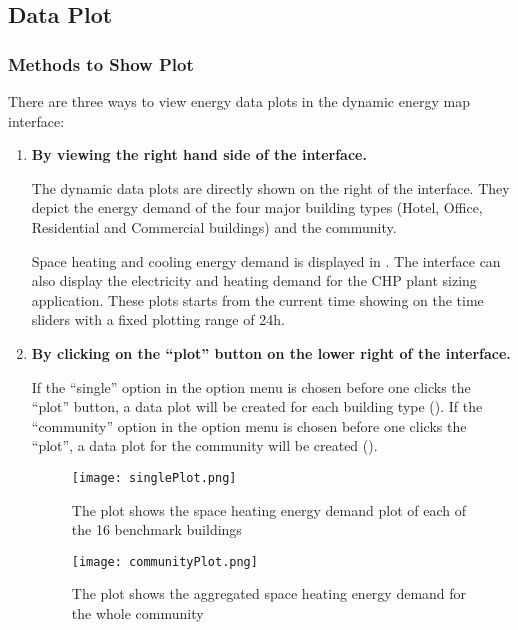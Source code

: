 \subsection{Data Plot}
\subsubsection{Methods to Show Plot}
There are three ways to view energy data plots in the dynamic energy
map interface:
\begin{enumerate}[1)]
\item \textbf{By viewing the right hand side of the interface.}

  The dynamic data plots are directly shown on the right of the
  interface. They depict the energy demand of the four major building
  types (Hotel, Office, Residential and Commercial buildings) and the
  community.

  Space heating and cooling energy demand is displayed in
  . The interface can also display the
  electricity and heating demand for the CHP plant sizing
  application. These plots starts from the current time showing on the
  time sliders with a fixed plotting range of 24h.

\item \textbf{By clicking on the ``plot'' button on the lower right of
    the interface.}

  If the ``single'' option in the option menu is chosen before one
  clicks the ``plot'' button, a data plot will be created for each
  building type (). If the ``community'' option
  in the option menu is chosen before one clicks the ``plot'', a data
  plot for the community will be created ().

  \begin{figure}[h!]
    \centering
    \texttt{[image: singlePlot.png]}
    \caption[Single Plots of 16 Building Types]{The plot shows the
      space heating energy demand plot of each of the 16 benchmark
      buildings}
    \label{fig:singlePlot}
  \end{figure}

  \begin{figure}[h!]
    \centering
    \texttt{[image: communityPlot.png]}
    \caption[Community Plot]{The plot shows the aggregated space
      heating energy demand for the whole community}
    \label{fig:communityPlot}
  \end{figure}


\end{enumerate}
